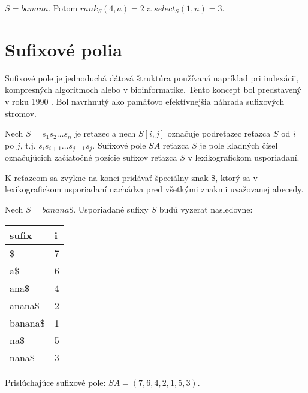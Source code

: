 \begin{example}
    $S = banana$. Potom $rank_S(4, a) = 2$ a $select_S(1, n) = 3$.
\end{example}


\section{Sufixové polia}

Sufixové pole je jednoduchá dátová štruktúra používaná napríklad pri indexácii,
kompresných algoritmoch alebo v bioinformatike. Tento koncept bol predstavený v
roku 1990 \cite{MM90}. Bol navrhnutý ako pamäťovo efektívnejšia náhrada
sufixových stromov.

\begin{defn}
    Nech $S = s_1 s_2 \ldots s_n$ je reťazec a nech $S[i, j]$ označuje
    podreťazec reťazca $S$ od $i$ po $j$, t.j. $s_i s_{i+1} \ldots s_{j-1} s_j$.
    Sufixové pole $SA$ reťazca $S$ je pole kladných čísel označujúcich začiatočné pozície sufixov reťazca $S$ v
    lexikografickom usporiadaní.
\end{defn}

K reťazcom sa zvykne na konci pridávať špeciálny znak \$, ktorý sa v
lexikografickom usporiadaní nachádza pred všetkými znakmi uvažovanej abecedy.

\begin{example}
    Nech $S = banana\$$. Usporiadané sufixy $S$ budú vyzerať nasledovne:
    \begin{center}
        \begin{tabular}{ | l | l | }
            \hline
            \textbf{sufix} & \textbf{i} \\ \hline
            \$             & 7          \\ \hline
            a\$            & 6          \\ \hline
            ana\$          & 4          \\ \hline
            anana\$        & 2          \\ \hline
            banana\$       & 1          \\ \hline
            na\$           & 5          \\ \hline
            nana\$         & 3          \\ \hline
        \end{tabular}
    \end{center}
    
    Prislúchajúce sufixové pole: $SA = (7, 6, 4, 2, 1, 5, 3)$.
\end{example}

